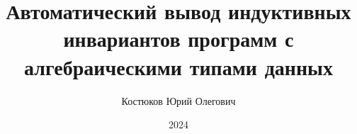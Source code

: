 \title{Автоматический вывод индуктивных инвариантов программ с алгебраическими типами данных}

\author{Костюков Юрий Олегович}




\date{2024}